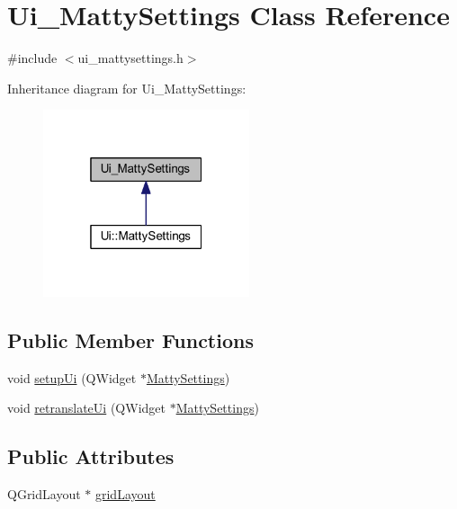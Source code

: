 \hypertarget{classUi__MattySettings}{}\section{Ui\+\_\+\+Matty\+Settings Class Reference}
\label{classUi__MattySettings}


{\ttfamily \#include $<$ui\+\_\+mattysettings.\+h$>$}



Inheritance diagram for Ui\+\_\+\+Matty\+Settings\+:
\nopagebreak
\begin{figure}[H]
\begin{center}
\leavevmode
\includegraphics[width=172pt]{classUi__MattySettings__inherit__graph}
\end{center}
\end{figure}
\subsection*{Public Member Functions}
\begin{DoxyCompactItemize}
\item 
void \hyperlink{classUi__MattySettings_aa5a49194b05cc0f4d7f06d99f18e253e}{setup\+Ui} (Q\+Widget $\ast$\hyperlink{classMattySettings}{Matty\+Settings})
\item 
void \hyperlink{classUi__MattySettings_aab5e7bc10516f3837b1c4e5cd33b9a76}{retranslate\+Ui} (Q\+Widget $\ast$\hyperlink{classMattySettings}{Matty\+Settings})
\end{DoxyCompactItemize}
\subsection*{Public Attributes}
\begin{DoxyCompactItemize}
\item 
Q\+Grid\+Layout $\ast$ \hyperlink{classUi__MattySettings_a289ca61cb5fd260abf4fbe3d872f6676}{grid\+Layout}
\end{DoxyCompactItemize}


